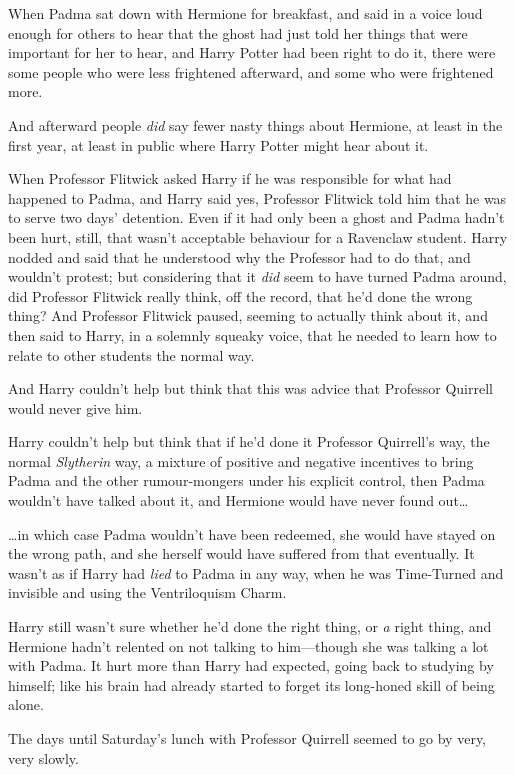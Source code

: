 When Padma sat down with Hermione for breakfast, and said in a voice
loud enough for others to hear that the ghost had just told her things
that were important for her to hear, and Harry Potter had been right to
do it, there were some people who were less frightened afterward, and
some who were frightened more.

And afterward people \emph{did} say fewer nasty things about Hermione,
at least in the first year, at least in public where Harry Potter might
hear about it.

When Professor Flitwick asked Harry if he was responsible for what had
happened to Padma, and Harry said yes, Professor Flitwick told him that
he was to serve two days' detention. Even if it had only been a ghost
and Padma hadn't been hurt, still, that wasn't acceptable behaviour for
a Ravenclaw student. Harry nodded and said that he understood why the
Professor had to do that, and wouldn't protest; but considering that it
\emph{did} seem to have turned Padma around, did Professor Flitwick
really think, off the record, that he'd done the wrong thing? And
Professor Flitwick paused, seeming to actually think about it, and then
said to Harry, in a solemnly squeaky voice, that he needed to learn how
to relate to other students the normal way.

And Harry couldn't help but think that this was advice that Professor
Quirrell would never give him.

Harry couldn't help but think that if he'd done it Professor Quirrell's
way, the normal \emph{Slytherin} way, a mixture of positive and negative
incentives to bring Padma and the other rumour-mongers under his
explicit control, then Padma wouldn't have talked about it, and Hermione
would have never found out\ldots{}

\ldots{}in which case Padma wouldn't have been redeemed, she would have
stayed on the wrong path, and she herself would have suffered from that
eventually. It wasn't as if Harry had \emph{lied} to Padma in any way,
when he was Time-Turned and invisible and using the Ventriloquism Charm.

Harry still wasn't sure whether he'd done the right thing, or \emph{a}
right thing, and Hermione hadn't relented on not talking to him---though
she was talking a lot with Padma. It hurt more than Harry had expected,
going back to studying by himself; like his brain had already started to
forget its long-honed skill of being alone.

The days until Saturday's lunch with Professor Quirrell seemed to go by
very, very slowly.
